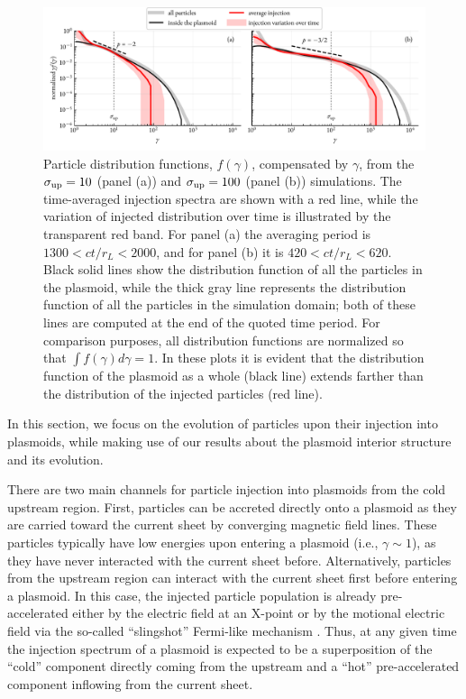 \begin{figure}[htb]
    \centering
    \includegraphics[width=\textwidth]{figures/ch2-reconnection/fig4.pdf}
    \caption{Particle distribution functions, $f(\gamma)$, compensated by $\gamma$, from  the $\sigma_{\rm up}=10$ (panel (a)) and $\sigma_{\rm up}=100$ (panel (b)) simulations. The time-averaged injection spectra are shown with a red line, while the variation of injected distribution over time is illustrated by the transparent red band. For panel (a) the averaging period is $1300<ct/r_L<2000$, and for panel (b) it is $420 < ct/r_L < 620$. Black solid lines show the distribution function of all the particles in the plasmoid, while the thick gray line represents the distribution function of all the particles in the simulation domain; both of these lines are computed at the end of the quoted time period. For comparison purposes, all distribution functions are normalized so that $\int f(\gamma)d\gamma=1$. In these plots it is evident that the distribution function of the plasmoid as a whole (black line) extends farther than the distribution of the injected particles (red line).}
    \label{fig:rec-injspec}
\end{figure}
In this section, we focus on the evolution of particles upon their injection into plasmoids, while making use of our results about the plasmoid interior structure and its evolution.

There are two main channels for particle injection into plasmoids from the cold upstream region. First, particles can be accreted directly onto a plasmoid as they are carried toward the current sheet by converging magnetic field lines. These particles typically have low energies upon entering a plasmoid (i.e., $\gamma \sim 1$), as they have never interacted with the current sheet before. Alternatively, particles from the upstream region can interact with the current sheet first before entering a plasmoid. In this case, the injected particle population is already pre-accelerated either by the electric field at an X-point \citep{2001ApJ...562L..63Z, 2003ApJ...586...72L, 2008ApJ...682.1436L} or by the motional electric field via the so-called ``slingshot'' Fermi-like mechanism \citep{2006Natur.443..553D, 2014PhRvL.113o5005G, 2015ApJ...806..167G}. Thus, at any given time the injection spectrum of a plasmoid is expected to be a superposition of the ``cold'' component directly coming from the upstream and a ``hot''  pre-accelerated component inflowing from the current sheet. 

